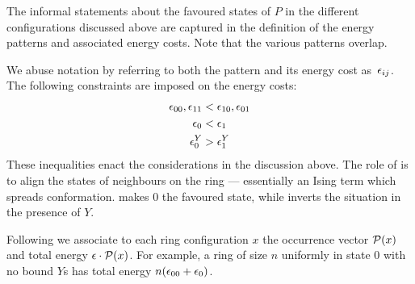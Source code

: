 The informal statements about the favoured states of $P$
in the different configurations discussed above are captured
in the definition of the energy patterns and associated energy costs.
Note that the various patterns overlap.



We abuse notation by referring to both the pattern
and its energy cost as~$\epsilon_{ij}$.
The following constraints are imposed
on the energy costs:
\begin{align}
  \label{eq:ePP}
  \epsilon_{00},\epsilon_{11} & {}< \epsilon_{10},\epsilon_{01} \\
  \label{eq:eP}
  \epsilon_{0} & {}< \epsilon_{1} \\
  \label{eq:ePY}
  \epsilon^Y_{0} & {}> \epsilon^Y_{1}
\end{align}
These inequalities enact the considerations in the discussion above.
The role of  is to align
the states of neighbours on the ring
--- essentially an Ising term which spreads conformation.
 makes $0$ the favoured state,
while  inverts the situation %
in the presence of $Y$.

Following 
we associate to each ring configuration $x$
the occurrence vector $\mathcal{P}(x)$
and total energy $\epsilon \cdot \mathcal{P}(x)$.
For example,
a ring of size $n$ uniformly in state $0$ with no bound $Y$s
has total energy $n(\epsilon_{00}+\epsilon_{0})$.

